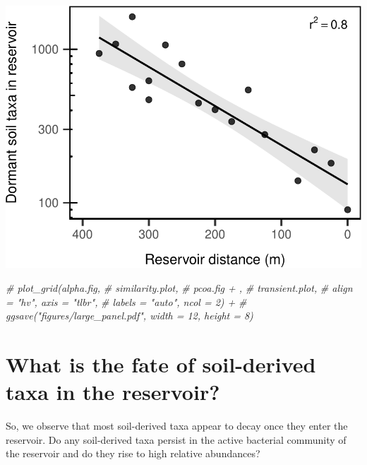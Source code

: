 \documentclass[]{article}
\newenvironment{Shaded}{\begin{snugshade}}{\end{snugshade}}
\newcommand{\CommentTok}[1]{\textcolor[rgb]{0.56,0.35,0.01}{\textit{#1}}}
\begin{document}
\begin{center}\includegraphics{ReservoirGradient_files/figure-latex/plot_transient-1} \end{center}

\begin{Shaded}
\begin{Highlighting}[]
\CommentTok{# plot_grid(alpha.fig, }
\CommentTok{#           similarity.plot, }
\CommentTok{#           pcoa.fig + , }
\CommentTok{#           transient.plot,}
\CommentTok{#           align = "hv", axis = "tlbr",}
\CommentTok{#           labels = "auto", ncol = 2) +}
\CommentTok{#   ggsave("figures/large_panel.pdf", width = 12, height = 8)}
\end{Highlighting}
\end{Shaded}

\section{What is the fate of soil-derived taxa in the
reservoir?}\label{what-is-the-fate-of-soil-derived-taxa-in-the-reservoir}

So, we observe that most soil-derived taxa appear to decay once they
enter the reservoir. Do any soil-derived taxa persist in the active
bacterial community of the reservoir and do they rise to high relative
abundances?
\end{document}
